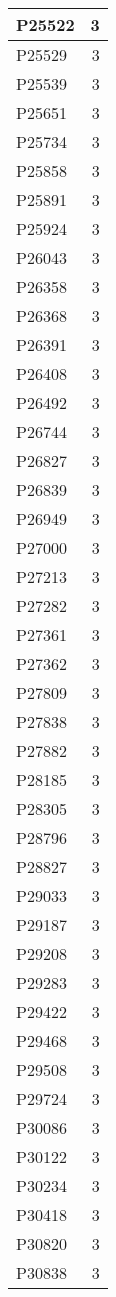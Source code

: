 \documentclass[
]{book}
\theoremstyle{definition}
\theoremstyle{definition}
\theoremstyle{definition}
\theoremstyle{definition}
\theoremstyle{remark}
\begin{document}
\begin{table}
\begin{tabular}{l|r}
\hline
P25522 & 3\\
\hline
P25529 & 3\\
\hline
P25539 & 3\\
\hline
P25651 & 3\\
\hline
P25734 & 3\\
\hline
P25858 & 3\\
\hline
P25891 & 3\\
\hline
P25924 & 3\\
\hline
P26043 & 3\\
\hline
P26358 & 3\\
\hline
P26368 & 3\\
\hline
P26391 & 3\\
\hline
P26408 & 3\\
\hline
P26492 & 3\\
\hline
P26744 & 3\\
\hline
P26827 & 3\\
\hline
P26839 & 3\\
\hline
P26949 & 3\\
\hline
P27000 & 3\\
\hline
P27213 & 3\\
\hline
P27282 & 3\\
\hline
P27361 & 3\\
\hline
P27362 & 3\\
\hline
P27809 & 3\\
\hline
P27838 & 3\\
\hline
P27882 & 3\\
\hline
P28185 & 3\\
\hline
P28305 & 3\\
\hline
P28796 & 3\\
\hline
P28827 & 3\\
\hline
P29033 & 3\\
\hline
P29187 & 3\\
\hline
P29208 & 3\\
\hline
P29283 & 3\\
\hline
P29422 & 3\\
\hline
P29468 & 3\\
\hline
P29508 & 3\\
\hline
P29724 & 3\\
\hline
P30086 & 3\\
\hline
P30122 & 3\\
\hline
P30234 & 3\\
\hline
P30418 & 3\\
\hline
P30820 & 3\\
\hline
P30838 & 3\\

\end{tabular}
\end{table}
\end{document}
